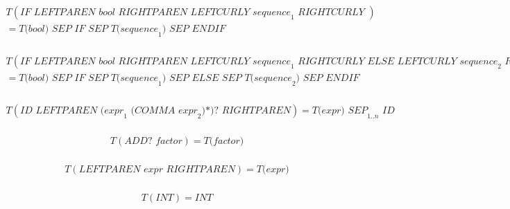 \documentclass[a4paper,12pt]{article}
\begin{document}
\begin{landscape}
\begin{equation} 
\begin{aligned}
    T( \textit{IF LEFTPAREN bool RIGHTPAREN LEFTCURLY sequence}_{1} \textit{ RIGHTCURLY })\\
    = \textit{T(bool) SEP IF SEP T(sequence}_{1} \textit{) SEP ENDIF} \\
\end{aligned}
\end{equation}

\begin{equation} 
\begin{aligned}
    T( \textit{IF LEFTPAREN bool RIGHTPAREN LEFTCURLY sequence}_{1} \textit{ RIGHTCURLY ELSE LEFTCURLY sequence}_{2} \textit{ RIGHTCURLY})\\
    = \textit{T(bool) SEP IF SEP T(sequence}_{1} \textit{) SEP ELSE SEP T(sequence}_{2} \textit{) SEP ENDIF} \\
\end{aligned}
\end{equation}

\begin{equation} 
\begin{aligned}
    T( \textit{ID LEFTPAREN (expr}_{1} \textit{ (COMMA expr}_{2} \textit{)*)? RIGHTPAREN})
    = \textit{T(expr) SEP}_{1..n} \textit{ ID}\\
\end{aligned}
\end{equation}

\begin{equation} 
\begin{aligned}
    T( \textit{ADD? factor})
    = \textit{T(factor)}\\
\end{aligned}
\end{equation}

\begin{equation} 
\begin{aligned}
    T( \textit{LEFTPAREN expr RIGHTPAREN})
    = \textit{T(expr)}\\
\end{aligned}
\end{equation}

\begin{equation} 
\begin{aligned}
    T( \textit{INT})
    = \textit{INT}\\
\end{aligned}
\end{equation}


\end{landscape}
\end{document}

